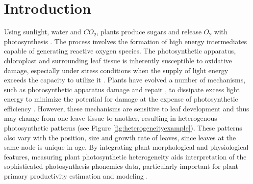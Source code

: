 \documentclass{bioinfo}
\begin{document}
\section{Introduction}

Using sunlight, water and $CO_2$, plants produce sugars and release $O_2$ with photosynthesis \citep{kramer2011importance}. The process involves the formation of high energy intermediates capable of generating reactive oxygen species. The photosynthetic apparatus, chloroplast and surrounding leaf tissue is inherently susceptible to oxidative damage, especially under stress conditions when the supply of light energy exceeds the capacity to utilize it \citep{asada1996radical,durrant1990characterisation}. Plants have evolved a number of mechanisms, such as photosynthetic apparatus damage and repair \citep{melis1999photosystem}, to dissipate excess light energy to minimize the potential for damage at the expense of photosynthetic efficiency \citep{adams2006energy,rochaix2014regulation}. However, these mechanisms are sensitive to leaf development and thus may change from one leave tissue to another, resulting in heterogenous photosynthetic patterns (see Figure \ref{fig:heterogeneityexample}). These patterns also vary with the position, size and growth rate of leaves, since leaves at the same node is unique in age. By integrating plant morphological and physiological features, measuring plant photosynthetic heterogeneity aids interpretation of the sophisticated photosynthesis phonemics data, particularly important for plant primary productivity estimation and modeling \citep{meng2007spatial}.



\end{document}
